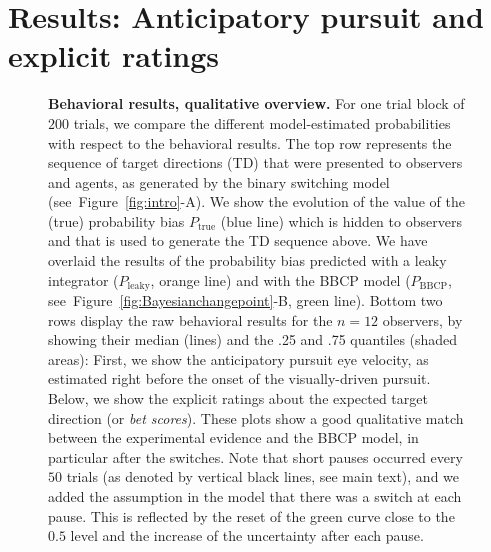 \documentclass[10pt,letterpaper]{article}
\newcommand{\seeFig}[1]{Figure~\ref{fig:#1}}
\begin{document}
\section*{Results: Anticipatory pursuit and explicit ratings}
\label{sec:results_psycho}
\begin{figure}%
\caption{
\textbf{Behavioral results, qualitative overview.} %
For one trial block of $200$ trials, we compare the different model-estimated probabilities with respect to the behavioral results.
The top row represents the sequence of target directions (TD)
that were presented to observers and agents,
as generated by the binary switching model (see~\seeFig{intro}-A).
We show the evolution of the value
of the (true) probability bias $P_{\text{true}}$ (blue line)
which is hidden to observers
and that is used to generate the TD sequence above.
We have overlaid the results of
the probability bias predicted with a leaky integrator ($P_{\text{leaky}}$, orange line)
and with the BBCP model ($P_{\text{BBCP}}$, see~\seeFig{Bayesianchangepoint}-B, green line).
Bottom two rows display the raw behavioral results
for the $n=12$ observers, by showing their median (lines) and the .25 and .75 quantiles (shaded areas):
First, we show the  anticipatory pursuit eye velocity, as estimated right before
the onset of the visually-driven pursuit.
Below, we show the explicit ratings about the expected target direction (or \textit{bet scores}).
These plots show a good qualitative match between
the experimental evidence and the BBCP model,
in particular after the switches.
Note that short pauses occurred every $50$ trials
(as denoted by vertical black lines, see main text),
and we added the assumption in the model
that there was a switch at each pause.
This is reflected by the reset of the green curve close to the $0.5$ level and
the increase of the uncertainty after each pause. %
}
\label{fig:results_psycho}
\end{figure}
\end{document}
